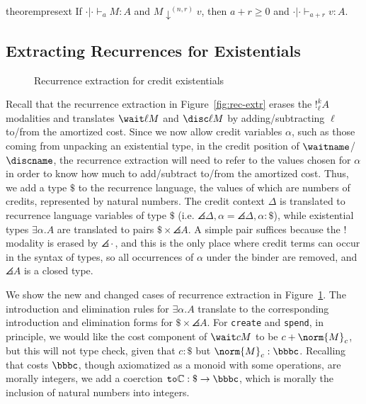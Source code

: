 \begin{restatable}[Preservation]{theorem}{presext}\label{thm:pres-ext}
If $\cdot | \cdot \vdash_a M : A$ and $M \downarrow^{(n,r)} v$, then $a + r \geq 0$ and $\cdot | \cdot \vdash_{a + r} v : A$.
\end{restatable}

\subsection{Extracting Recurrences for Existentials}
\begin{figure}
  
  \caption{Recurrence extraction for credit existentials}
  \label{fig:la-ex}
\end{figure}

Recall that the recurrence extraction in Figure~\ref{fig:rec-extr}
erases the $!^k_\ell A$ modalities and translates $\wait \ell M$ and $\disc \ell M$ by adding/subtracting $\ell$ to/from the amortized cost.
Since we now allow credit variables $\alpha$, such as those coming from unpacking an existential type, in the credit position of $\waitname$/$\discname$, the recurrence extraction will need to refer to the values chosen for $\alpha$ in order to know how much to add/subtract to/from the amortized cost.
Thus, we add a type $\$$ to the recurrence language, the values of which are numbers of credits, represented by natural numbers.  The credit context $\Delta$ is translated to recurrence language variables of type $\$$
(i.e. $\angles{\Delta,\alpha} = \angles{\Delta},\alpha : \$$), while existential types $\exists \alpha.A$ are translated to pairs  $\$ \times \angles{A}$.  A simple pair suffices because the $!$ modality is erased by $\angles{\cdot}$, and this is the only place where credit terms can occur in the syntax of types, so all occurrences of $\alpha$ under the binder are removed, and $\angles{A}$ is a closed type.

We show the new and changed cases of recurrence extraction in Figure~\ref{fig:la-ex}.  The introduction and elimination rules for $\exists \alpha . A$ translate to the corresponding introduction and elimination forms for $\$ \times \angles{A}$.
For \texttt{create} and \texttt{spend}, in principle, we would like the cost component of $\wait c M$ to be $c + \norm{M}_c$, but this will not type check, given that $c : \$$ but $\norm{M}_c : \bbbc$.
Recalling that costs $\bbbc$, though axiomatized as a monoid with some operations, are morally integers, we add a coerction $\texttt{to}\mathbb{C} : \$ \to \bbbc$, which is morally the inclusion of natural numbers into integers.

